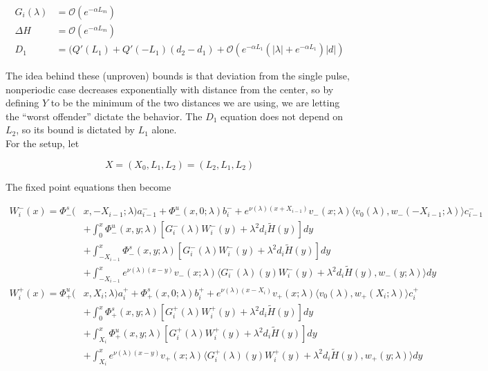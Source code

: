 \documentclass[12pt]{article}
\begin{document}
\begin{align*}
G_i(\lambda) &= \mathcal{O}(e^{-\alpha L_m}) \\
\Delta H &= \mathcal{O}(e^{-\alpha L_m}) \\
D_1 &= ( Q'(L_1) + Q'(-L_1 )(d_2 - d_1 ) + \mathcal{O} \left( e^{-\alpha L_1} \left( |\lambda| +  e^{-\alpha L_1}  \right) |d| \right)
\end{align*}

The idea behind these (unproven) bounds is that deviation from the single pulse, nonperiodic case decreases exponentially with distance from the center, so by defining $Y$ to be the minimum of the two distances we are using, we are letting the ``worst offender'' dictate the behavior. The $D_1$ equation does not depend on $L_2$, so its bound is dictated by $L_1$ alone.\\

For the setup, let

\[
X = (X_0, L_1, L_2) = (L_2, L_1, L_2)
\]

The fixed point equations then become

\begin{align*}
W_i^-(x) = \Phi^s_-(&x, -X_{i-1}; \lambda)a_{i-1}^- + \Phi^u_-(x, 0; \lambda)b_i^- + e^{\nu(\lambda)(x+X_{i-1})} v_-(x; \lambda) \langle v_0(\lambda), w_-(-X_{i-1}; \lambda) \rangle c_{i-1}^- \\
&+ \int_0^x \Phi^u_-(x, y; \lambda)[ G_i^-(\lambda)W_i^-(y) + \lambda^2 d_i \tilde{H}(y) ] dy \\
&+ \int_{-X_{i-1}}^x \Phi^s_-(x, y; \lambda) [ G_i^-(\lambda)W_i^-(y) + \lambda^2 d_i \tilde{H}(y) ] dy \\
&+ \int_{-X_{i-1}}^x 
e^{\nu(\lambda)(x-y)} v_-(x; \lambda) \langle G_i^-(\lambda)(y)W_i^-(y) + \lambda^2 d_i \tilde{H}(y), w_-(y; \lambda) \rangle dy \\
W_i^+(x) = \Phi^u_+(&x, X_i; \lambda)a_i^+ + \Phi^s_+(x, 0; \lambda)b_i^+ + e^{\nu(\lambda)(x - X_i)} v_+(x; \lambda) \langle v_0(\lambda), w_+(X_i; \lambda) \rangle c_i^+ \\
&+ \int_0^x \Phi^s_+(x, y; \lambda) [ G_i^+(\lambda)W_i^+(y) + \lambda^2 d_i \tilde{H}(y) ] dy \\
&+ \int_{X_i}^x \Phi^u_+(x, y; \lambda) [ G_i^+(\lambda)W_i^+(y) + \lambda^2 d_i \tilde{H}(y) ] dy \\
&+ \int_{X_i}^x e^{\nu(\lambda)(x-y)} v_+(x; \lambda) \langle G_i^+(\lambda)(y)W_i^+(y) + \lambda^2 d_i \tilde{H}(y), w_+(y; \lambda) \rangle dy
\end{align*}
\end{document}
